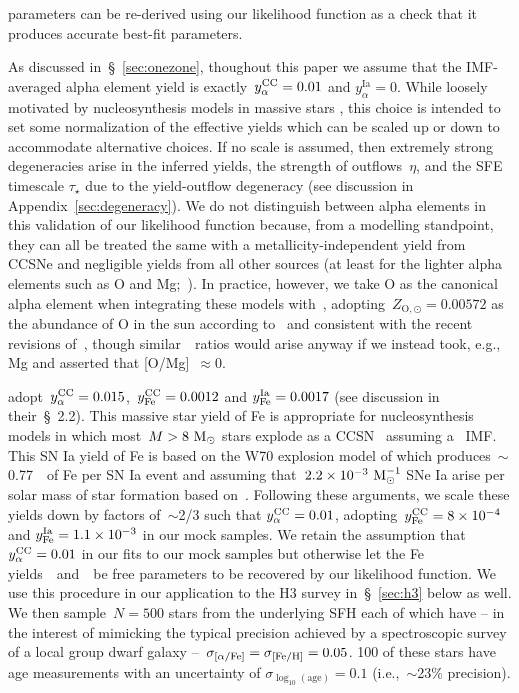 \documentclass[foo.tex]{subfiles}
\begin{document}
parameters can be re-derived using our likelihood function as a check that it
produces accurate best-fit parameters.
\par
As discussed in~\S~\ref{sec:onezone}, thoughout this paper we assume that the
IMF-averaged alpha element yield is exactly~$y_\alpha^\text{CC} = 0.01$ and
$y_\alpha^\text{Ia} = 0$.
While loosely motivated by nucleosynthesis models in massive stars
\citep[e.g.,][]{Nomoto2013, Sukhbold2016, Limongi2018}, this choice is intended
to set some normalization of the effective yields which can be scaled up or
down to accommodate alternative choices.
If no scale is assumed, then extremely strong degeneracies arise in the
inferred yields, the strength of outflows~$\eta$, and the SFE timescale
$\tau_\star$ due to the yield-outflow degeneracy (see discussion in
Appendix~\ref{sec:degeneracy}).
We do not distinguish between alpha elements in this validation of our
likelihood function because, from a modelling standpoint, they can all be
treated the same with a metallicity-independent yield from CCSNe and negligible
yields from all other sources (at least for the lighter alpha elements such as
O and Mg;~\citealp{Johnson2019}).
In practice, however, we take O as the canonical alpha element when integrating
these models with~\vice, adopting~$Z_{\text{O},\odot} = 0.00572$ as the
abundance of O in the sun according to~\citet{Asplund2009} and consistent with
the recent revisions of~\citet*{Asplund2021}, though similar~\afe~ratios would
arise anyway if we instead took, e.g., Mg and asserted that [O/Mg]~$\approx 0$.
\par
\citet{Weinberg2017} adopt~$y_\alpha^\text{CC} = 0.015$,~$y_\text{Fe}^\text{CC} = 0.0012$ and
$y_\text{Fe}^\text{Ia} = 0.0017$ (see discussion in their~\S~2.2).
This massive star yield of Fe is appropriate for nucleosynthesis models in
which most~$M > 8~\text{M}_\odot$ stars explode as a CCSN~\citep[e.g.,][]{Woosley1995,
Chieffi2004, Chieffi2013, Nomoto2013} assuming a~\citet{Kroupa2001} IMF.
This SN Ia yield of Fe is based on the W70 explosion model of
\citet{Iwamoto1999} which produces~$\sim$0.77~\msun~of Fe per SN Ia event and
assuming that~$2.2\times10^{-3}~\text{M}_\odot^{-1}$ SNe Ia arise per solar mass of
star formation based on~\citet{Maoz2012a}.
Following these arguments, we scale these yields down by factors of~$\sim$2/3
such that $y_\alpha^\text{CC} = 0.01$, adopting~$y_\text{Fe}^\text{CC} = 8\times10^{-4}$ and
$y_\text{Fe}^\text{Ia} = 1.1\times10^{-3}$ in our mock samples.
We retain the assumption that~$y_\alpha^\text{CC} = 0.01$ in our fits to our mock samples
but otherwise let the Fe yields~\yfecc~and~\yfeia~be free parameters to be
recovered by our likelihood function.
We use this procedure in our application to the H3 survey in~\S~\ref{sec:h3}
below as well.
We then sample~$N = 500$ stars from the underlying SFH each of which have -- in
the interest of mimicking the typical precision achieved by a spectroscopic
survey of a local group dwarf galaxy --~$\sigma_{\text{[$\alpha$/Fe]}} = \sigma_{\text{[Fe/H]}} = 0.05$.
100 of these stars have age measurements with an uncertainty of
$\sigma_{\log_{10}(\text{age})} = 0.1$ (i.e.,~$\sim$23\% precision).
\end{document}

